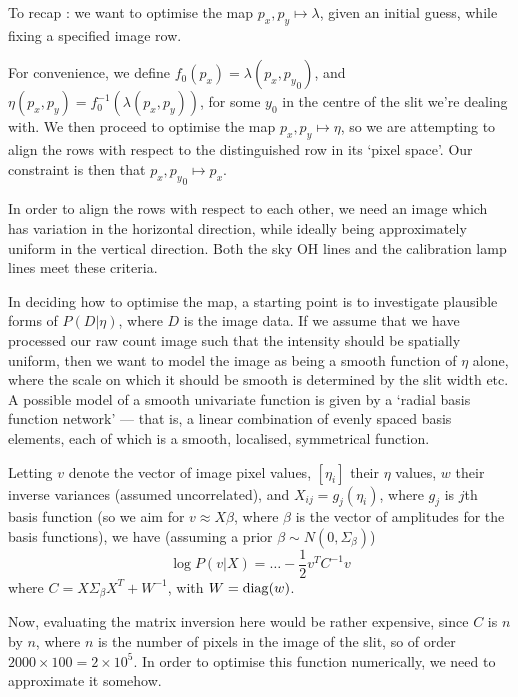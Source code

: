 To recap : we want to optimise the map $p_x, p_y \mapsto \lambda$, given
an initial guess, while fixing a specified image row.

For convenience, we define $f_0 (p_x) = \lambda (p_x, {p_y}_0)$, and
$\eta (p_x, p_y) = f_0^{-1} (\lambda (p_x, p_y))$, for some $y_0$
in the centre of the slit we're dealing with. We then proceed to
optimise the map $p_x, p_y \mapsto \eta$, so we are attempting to align
the rows with respect to the distinguished row in its `pixel space'. Our
constraint is then that $p_x, {p_y}_0 \mapsto p_x$.

In order to align the rows with respect to each other, we need an image
which has variation in the horizontal direction, while ideally being
approximately uniform in the vertical direction. Both the sky OH lines
and the calibration lamp lines meet these criteria.

In deciding how to optimise the map, a starting point is to investigate
plausible forms of $P(D|\eta)$, where $D$ is the image data. If we
assume that we have processed our raw count image such that the
intensity should be spatially uniform, then we want to model the image
as being a smooth function of $\eta$ alone, where the scale on which it
should be smooth is determined by the slit width etc. A possible model
of a smooth univariate function is given by a `radial basis function
network' --- that is, a linear combination of evenly spaced basis
elements, each of which is a smooth, localised, symmetrical function.


Letting $v$ denote the vector of image pixel values, $[\eta_i]$ their $\eta$
values, $w$ their inverse variances (assumed uncorrelated), and $X_{ij}
= g_j (\eta_i)$, where $g_j$ is $j$th basis function (so we aim for $v
\approx X \beta$, where $\beta$ is the vector of amplitudes for the
basis functions), we have (assuming a prior $\beta \sim N (0, \Sigma_\beta)$) %
\[
\log P(v|X) = \dots - \frac{1}{2}v^T C^{-1} v
\]
where $C = X \Sigma_\beta X^T + W^{-1}$, with $W = {\rm diag}(w)$.

Now, evaluating the matrix inversion here would be rather expensive, since
$C$ is $n$ by $n$, where $n$ is the number of pixels in the image of the slit, so
of order $2000 \times 100 = 2 \times 10^5$. In order to optimise this function
numerically, we need to approximate it somehow. 


